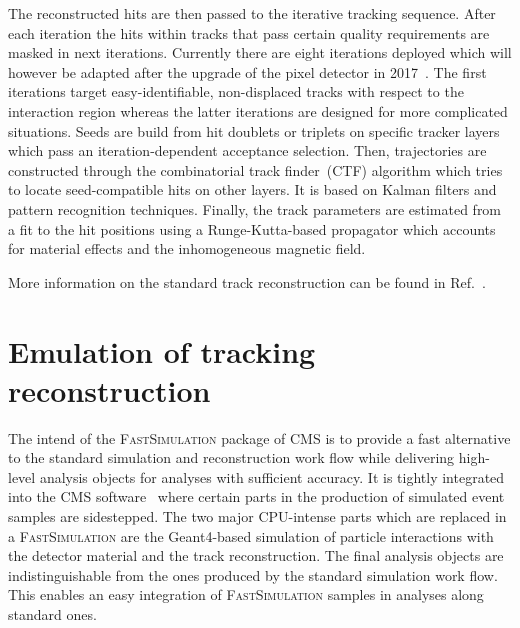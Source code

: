 \documentclass[a4paper]{jpconf}
\begin{document}
The reconstructed hits are then passed to the iterative tracking sequence. After each iteration the hits within tracks that pass certain quality requirements are masked in next iterations. Currently there are eight iterations deployed which will however be adapted after the upgrade of the pixel detector in 2017~\cite{pixelphase1}. The first iterations target easy-identifiable, non-displaced tracks with respect to the interaction region whereas the latter iterations are designed for more complicated situations. Seeds are build from hit doublets or triplets on specific tracker layers which pass an iteration-dependent acceptance selection. Then, trajectories are constructed through the combinatorial track finder~(CTF) algorithm which tries to locate seed-compatible hits on other layers. It is based on Kalman filters and pattern recognition techniques.  Finally, the track parameters are estimated from a fit to the hit positions using a Runge-Kutta-based propagator which accounts for material effects and the inhomogeneous magnetic field.

More information on the standard track reconstruction can be found in Ref.~\cite{trackreco}.


\section{Emulation of tracking reconstruction}

The intend of the \textsc{FastSimulation} package of CMS is to provide a fast alternative to the standard simulation and reconstruction work flow while delivering high-level analysis objects for analyses with sufficient accuracy. It is tightly integrated into the CMS software~\cite{cmssw} where certain parts in the production of simulated event samples are sidestepped. The two major CPU-intense parts which are replaced in a \textsc{FastSimulation} are the Geant4-based simulation of particle interactions with the detector material and the track reconstruction. The final analysis objects are indistinguishable from the ones produced by the standard simulation work flow. This enables an easy integration of \textsc{FastSimulation} samples in analyses along standard ones.
\end{document}
